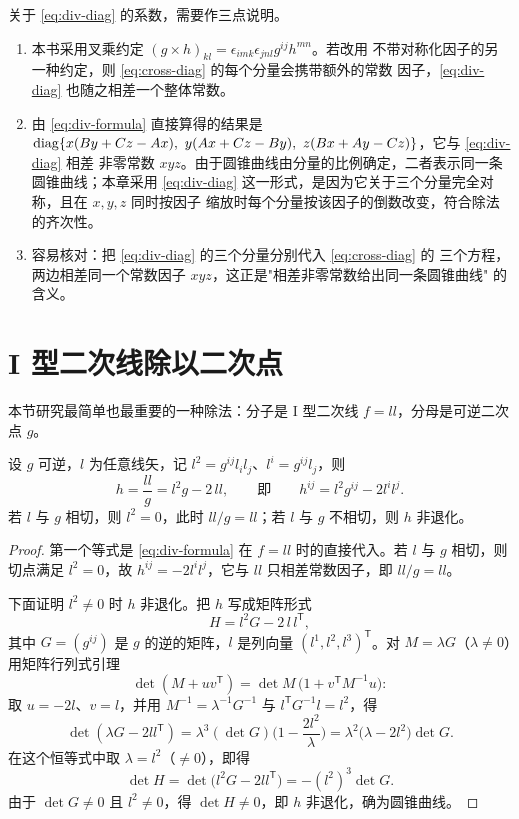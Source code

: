 \begin{remark}
关于 \eqref{eq:div-diag} 的系数，需要作三点说明。
\begin{enumerate}[label=(\arabic*),itemsep=2pt]
  \item 本书采用叉乘约定 $(g\times h)_{kl}=\epsilon_{imk}\epsilon_{jnl}g^{ij}h^{mn}$。若改用
        不带对称化因子的另一种约定，则 \eqref{eq:cross-diag} 的每个分量会携带额外的常数
        因子，\eqref{eq:div-diag} 也随之相差一个整体常数。
  \item 由 \eqref{eq:div-formula} 直接算得的结果是
        $\diag\{x(By+Cz-Ax),\ y(Ax+Cz-By),\ z(Bx+Ay-Cz)\}$，它与 \eqref{eq:div-diag} 相差
        非零常数 $xyz$。由于圆锥曲线由分量的比例确定，二者表示同一条圆锥曲线；本章采用
        \eqref{eq:div-diag} 这一形式，是因为它关于三个分量完全对称，且在 $x,y,z$ 同时按因子
        缩放时每个分量按该因子的倒数改变，符合除法的齐次性。
  \item 容易核对：把 \eqref{eq:div-diag} 的三个分量分别代入 \eqref{eq:cross-diag} 的
        三个方程，两边相差同一个常数因子 $xyz$，这正是"相差非零常数给出同一条圆锥曲线"
        的含义。
\end{enumerate}
\end{remark}

\section{I 型二次线除以二次点}

本节研究最简单也最重要的一种除法：分子是 I 型二次线 $f=ll$，分母是可逆二次点 $g$。

\begin{proposition}
\label{prop:ll-div}
设 $g$ 可逆，$l$ 为任意线矢，记 $l^2=g^{ij}l_il_j$、$l^i=g^{ij}l_j$，则
\begin{equation}
\label{eq:ll-div}
h=\frac{ll}{g}=l^2g-2\,ll,
\qquad\text{即}\qquad
h^{ij}=l^2g^{ij}-2l^il^j .
\end{equation}
若 $l$ 与 $g$ 相切，则 $l^2=0$，此时 $ll/g=ll$；若 $l$ 与 $g$ 不相切，则 $h$ 非退化。
\end{proposition}

\begin{proof}
第一个等式是 \eqref{eq:div-formula} 在 $f=ll$ 时的直接代入。若 $l$ 与 $g$ 相切，则切点满足
$l^2=0$，故 $h^{ij}=-2l^il^j$，它与 $ll$ 只相差常数因子，即 $ll/g=ll$。

下面证明 $l^2\ne0$ 时 $h$ 非退化。把 $h$ 写成矩阵形式
\[
H=l^2G-2\,l\,l^{\mathsf T},
\]
其中 $G=(g^{ij})$ 是 $g$ 的逆的矩阵，$l$ 是列向量 $(l^1,l^2,l^3)^{\mathsf T}$。对
$M=\lambda G$（$\lambda\ne0$）用矩阵行列式引理
\[
\det(M+uv^{\mathsf T})=\det M\,\big(1+v^{\mathsf T}M^{-1}u\big):
\]
取 $u=-2l$、$v=l$，并用 $M^{-1}=\lambda^{-1}G^{-1}$ 与 $l^{\mathsf T}G^{-1}l=l^2$，得
\[
\det(\lambda G-2ll^{\mathsf T})
=\lambda^3(\det G)\Big(1-\frac{2l^2}{\lambda}\Big)
=\lambda^2\big(\lambda-2l^2\big)\det G .
\]
在这个恒等式中取 $\lambda=l^2$（$\ne0$），即得
\begin{equation}
\label{eq:det-h}
\det H=\det\big(l^2G-2ll^{\mathsf T}\big)=-(l^2)^3\det G .
\end{equation}
由于 $\det G\ne0$ 且 $l^2\ne0$，得 $\det H\ne0$，即 $h$ 非退化，确为圆锥曲线。
\end{proof}

